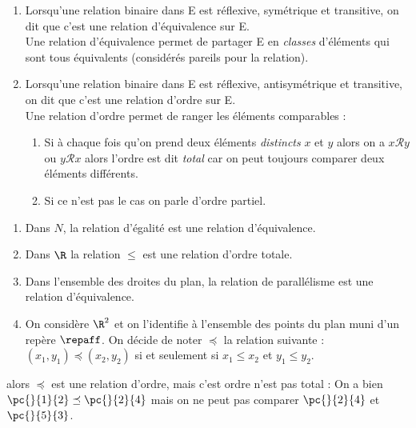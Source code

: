 \documentclass[a4paper,12pt,french]{book}
\begin{document}
\begin{definition}
\begin{enumerate}[--]
	\item 	Lorsqu'une relation binaire dans E est réflexive, symétrique et transitive, on dit que c'est une relation d'équivalence sur E.\\
			Une relation d'équivalence permet de partager E en \textit{classes} d'éléments qui sont tous équivalents (considérés \og pareils\fg{} pour la relation).
	\item 	Lorsqu'une relation binaire dans E est réflexive, antisymétrique et transitive, on dit que c'est une relation d'ordre sur E.\\
			Une relation d'ordre permet de \og ranger les éléments comparables \fg{} :
			\begin{enumerate}[\textbullet]
				\item 	Si à chaque fois qu'on prend deux éléments \textit{distincts} $x$ et $y$ alors on a $x\mathcal{R}y$ ou $y\mathcal{R}x$ alors l'ordre est dit \textit{total} car on peut toujours comparer deux éléments différents.
				\item 	Si ce n'est pas le cas on parle d'ordre partiel.
			\end{enumerate}
\end{enumerate}
\end{definition}

\begin{exemple}[s]
\begin{enumerate}[--]
	\item 	Dans $N$, la relation d'égalité est une relation d'équivalence.
	\item 	Dans $\R$ la relation $\leqslant$ est une relation d'ordre totale.
	\item 	Dans l'ensemble des droites du plan, la relation de parallélisme est une relation d'équivalence.
	\item 	On considère $\R^2$ et on l'identifie à l'ensemble des points du plan muni d'un repère $\repaff$.
			On décide de noter $\preceq$ la relation suivante :\\ $(x_1,y_1)\preceq(x_2,y_2)$ si et seulement si $x_1\leqslant x_2$ et $y_1\leqslant y_2$.
			\begin{center}
			\end{center}
\end{enumerate}
alors $\preceq$ est une relation d'ordre, mais c'est ordre n'est pas total  : On a bien $\pc{}{1}{2}\preceq\pc{}{2}{4}$ mais on ne peut pas comparer $\pc{}{2}{4}$ et $\pc{}{5}{3}$.
\end{exemple}
\end{document}
